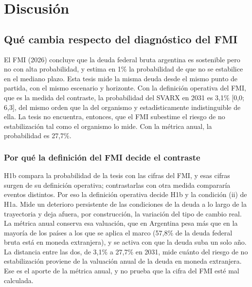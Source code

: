 \chapter{Discusión}

\section{Qué cambia respecto del diagnóstico del FMI}

El FMI (2026) concluye que la deuda federal bruta argentina es
sostenible pero no con alta probabilidad, y estima en 1\% la
probabilidad de que no se estabilice en el mediano plazo. Esta tesis
mide la misma deuda desde el mismo punto de partida, con el mismo
escenario y horizonte. Con la definición operativa del FMI, que es la
medida del contraste, la probabilidad del SVARX en 2031 es 3,1\% {[}0,0;
6,3{]}, del mismo orden que la del organismo y estadísticamente
indistinguible de ella. La tesis no encuentra, entonces, que el FMI
subestime el riesgo de no estabilización tal como el organismo lo mide.
Con la métrica anual, la probabilidad es 27,7\%.

\subsection{Por qué la definición del FMI decide el contraste}

H1b compara la probabilidad de la tesis con las cifras del FMI, y esas
cifras surgen de su definición operativa; contrastarlas con otra medida
compararía eventos distintos. Por eso la definición operativa decide H1b
y la condición (ii) de H1a. Mide un deterioro persistente de las
condiciones de la deuda a lo largo de la trayectoria y deja afuera, por
construcción, la variación del tipo de cambio real. La métrica anual
conserva esa valuación, que en Argentina pesa más que en la mayoría de
los países a los que se aplica el marco (57,8\% de la deuda federal
bruta está en moneda extranjera), y se activa con que la deuda suba un
solo año. La distancia entre las dos, de 3,1\% a 27,7\% en 2031, mide
cuánto del riesgo de no estabilización proviene de la valuación anual de
la deuda en moneda extranjera. Ese es el aporte de la métrica anual, y
no prueba que la cifra del FMI esté mal calculada.

